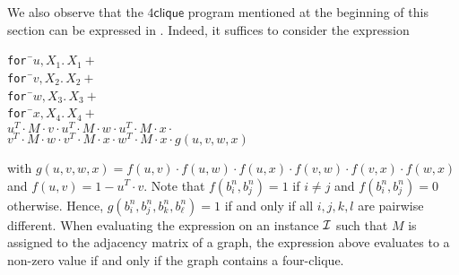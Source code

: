 We also observe that the $4\textsf{clique}$ program mentioned at the beginning of this section can 
be expressed in \langfor. Indeed, it suffices to consider the expression
\begin{tabbing}
\texttt{for }\=$u,X_1.\, X_1 + $\\
\> \texttt{for }\=$v,X_2.\, X_2 +$ \\
\>\>\texttt{for }\=$w,X_3.\, X_3 +$ \\
\>\>\>\texttt{for }\=$x,X_4.\, X_4 +$ \\
\>\>\>\>$u^T\cdot M\cdot v \cdot u^T\cdot M\cdot w\cdot u^T\cdot M\cdot x \cdot $\\
\>\>\>\>$v^T\cdot M\cdot w \cdot v^T\cdot M\cdot x\cdot w^T\cdot M\cdot x \cdot g(u,v,w,x)$\\
\end{tabbing}
with $g(u,v,w,x)=f(u,v)\cdot f(u,w)\cdot f(u,x)\cdot f(v,w)\cdot f(v,x)\cdot f(w,x)$ and
$f(u,v)=1-u^T\cdot v$. Note that $f(b_i^n,b_j^n)=1$ if $i\neq j$ and $f(b_i^n,b_j^n)=0$ otherwise.
Hence, $g(b_i^n,b_j^n,b_k^n,b_\ell^n)=1$ if and only if all $i,j,k,l$ are pairwise different.
When evaluating the expression on an instance $\mathcal{I}$ such that $M$ is assigned to the adjacency 
matrix of a graph, the expression above evaluates to a non-zero value if and only if the graph
contains a four-clique.
%
%

